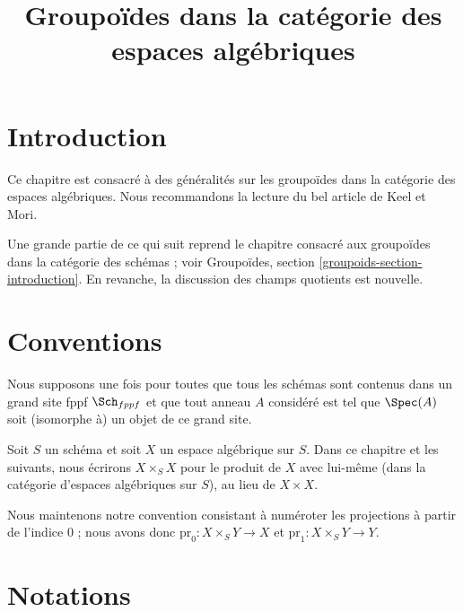 

%


\title{Groupoïdes dans la catégorie des espaces algébriques}


\maketitle

\label{section-phantom}

\tableofcontents

\section{Introduction}
\label{section-introduction}

\noindent
Ce chapitre est consacré à des généralités sur les groupoïdes dans la catégorie des espaces algébriques. Nous recommandons la lecture du bel article \cite{K-M} de Keel et Mori.

\medskip\noindent
Une grande partie de ce qui suit reprend le chapitre consacré aux groupoïdes dans la catégorie des schémas ; voir Groupoïdes, section \ref{groupoids-section-introduction}. En revanche, la discussion des champs quotients est nouvelle.


\section{Conventions}
\label{section-conventions}

\noindent
Nous supposons une fois pour toutes que tous les schémas sont contenus dans un grand site fppf $\Sch_{fppf}$ et que tout anneau $A$ considéré est tel que $\Spec(A)$ soit (isomorphe à) un objet de ce grand site.

\medskip\noindent
Soit $S$ un schéma et soit $X$ un espace algébrique sur $S$. Dans ce chapitre et les suivants, nous écrirons $X \times_S X$ pour le produit de $X$ avec lui-même (dans la catégorie d'espaces algébriques sur $S$), au lieu de $X \times X$.

\medskip\noindent
Nous maintenons notre convention consistant à numéroter les projections à partir de l'indice $0$ ; nous avons donc $\text{pr}_0 : X \times_S Y \to X$ et $\text{pr}_1 : X \times_S Y \to Y$.




\section{Notations}
\label{section-notation}

